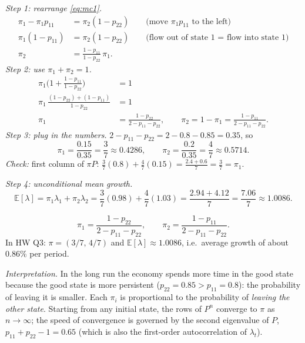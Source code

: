 \textit{Step 1: rearrange \eqref{eq:mc1}.}
\begin{align*}
\pi_1-\pi_1p_{11}&=\pi_2(1-p_{22})\qquad\text{(move $\pi_1p_{11}$ to the left)}\\
\pi_1(1-p_{11})&=\pi_2(1-p_{22})\qquad\text{(flow out of state 1 = flow into state 1)}\\
\pi_2&=\frac{1-p_{11}}{1-p_{22}}\,\pi_1.
\end{align*}
\textit{Step 2: use $\pi_1+\pi_2=1$.}
\begin{align*}
\pi_1\Big(1+\frac{1-p_{11}}{1-p_{22}}\Big)&=1\\
\pi_1\,\frac{(1-p_{22})+(1-p_{11})}{1-p_{22}}&=1\\
\pi_1&=\frac{1-p_{22}}{2-p_{11}-p_{22}},\qquad \pi_2=1-\pi_1=\frac{1-p_{11}}{2-p_{11}-p_{22}}.
\end{align*}
\textit{Step 3: plug in the numbers.} $2-p_{11}-p_{22}=2-0.8-0.85=0.35$, so
\[
\pi_1=\frac{0.15}{0.35}=\frac37\approx0.4286,\qquad \pi_2=\frac{0.2}{0.35}=\frac47\approx0.5714.
\]
\textit{Check:} first column of $\pi P$: $\tfrac37(0.8)+\tfrac47(0.15)=\tfrac{2.4+0.6}{7}=\tfrac37=\pi_1$. \checkmark

\textit{Step 4: unconditional mean growth.}
\[
\mathbb{E}[\lambda]=\pi_1\lambda_1+\pi_2\lambda_2=\frac37(0.98)+\frac47(1.03)=\frac{2.94+4.12}{7}=\frac{7.06}{7}\approx1.0086.
\]

\begin{keybox}[title=Two-state Markov chain]
\[
\pi_1=\frac{1-p_{22}}{2-p_{11}-p_{22}},\qquad \pi_2=\frac{1-p_{11}}{2-p_{11}-p_{22}}.
\]
In HW Q3: $\pi=(3/7,\,4/7)$ and $\mathbb{E}[\lambda]\approx1.0086$, i.e.\ average growth of about $0.86\%$ per period.
\end{keybox}
\textit{Interpretation.} In the long run the economy spends more time in the good state because the good state is more persistent ($p_{22}=0.85>p_{11}=0.8$): the probability of leaving it is smaller. Each $\pi_i$ is proportional to the probability of \emph{leaving the other state}. Starting from any initial state, the rows of $P^n$ converge to $\pi$ as $n\to\infty$; the speed of convergence is governed by the second eigenvalue of $P$, $p_{11}+p_{22}-1=0.65$ (which is also the first-order autocorrelation of $\lambda_t$).
